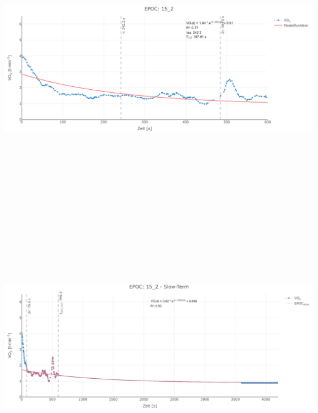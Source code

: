 \documentclass[
  letterpaper,
  DIV=11]{scrartcl}
\begin{document}
\includegraphics[width=11.45833in,height=4.6875in]{images/15_2_tau.png}
\includegraphics[width=11.45833in,height=4.6875in]{images/15_2_slow.png}
\end{document}
